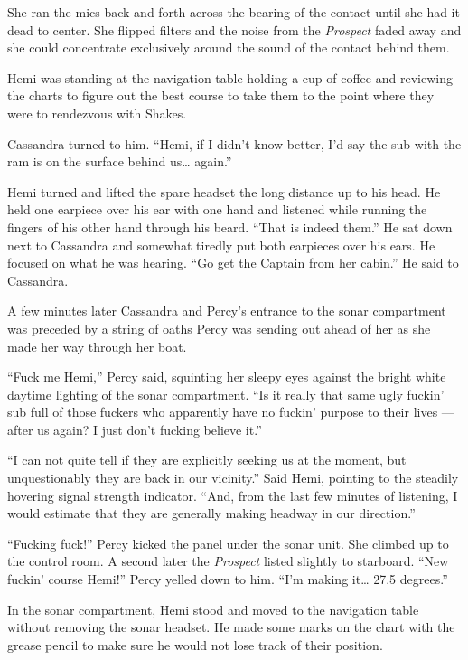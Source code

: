 \documentclass[
]{scrbook}
\begin{document}
She ran the mics back and forth across the bearing of the contact until
she had it dead to center. She flipped filters and the noise from the
\emph{Prospect} faded away and she could concentrate exclusively around
the sound of the contact behind them.

Hemi was standing at the navigation table holding a cup of coffee and
reviewing the charts to figure out the best course to take them to the
point where they were to rendezvous with Shakes.

Cassandra turned to him. ``Hemi, if I didn't know better, I'd say the
sub with the ram is on the surface behind us\ldots{} again.''

Hemi turned and lifted the spare headset the long distance up to his
head. He held one earpiece over his ear with one hand and listened while
running the fingers of his other hand through his beard. ``That is
indeed them.'' He sat down next to Cassandra and somewhat tiredly put
both earpieces over his ears. He focused on what he was hearing. ``Go
get the Captain from her cabin.'' He said to Cassandra.

A few minutes later Cassandra and Percy's entrance to the sonar
compartment was preceded by a string of oaths Percy was sending out
ahead of her as she made her way through her boat.

``Fuck me Hemi,'' Percy said, squinting her sleepy eyes against the
bright white daytime lighting of the sonar compartment. ``Is it really
that same ugly fuckin' sub full of those fuckers who apparently have no
fuckin' purpose to their lives --- after us again? I just don't fucking
believe it.''

``I can not quite tell if they are explicitly seeking us at the moment,
but unquestionably they are back in our vicinity.'' Said Hemi, pointing
to the steadily hovering signal strength indicator. ``And, from the last
few minutes of listening, I would estimate that they are generally
making headway in our direction.''

``Fucking fuck!'' Percy kicked the panel under the sonar unit. She
climbed up to the control room. A second later the \emph{Prospect}
listed slightly to starboard. ``New fuckin' course Hemi!'' Percy yelled
down to him. ``I'm making it\ldots{} 27.5 degrees.''

In the sonar compartment, Hemi stood and moved to the navigation table
without removing the sonar headset. He made some marks on the chart with
the grease pencil to make sure he would not lose track of their
position.
\end{document}
